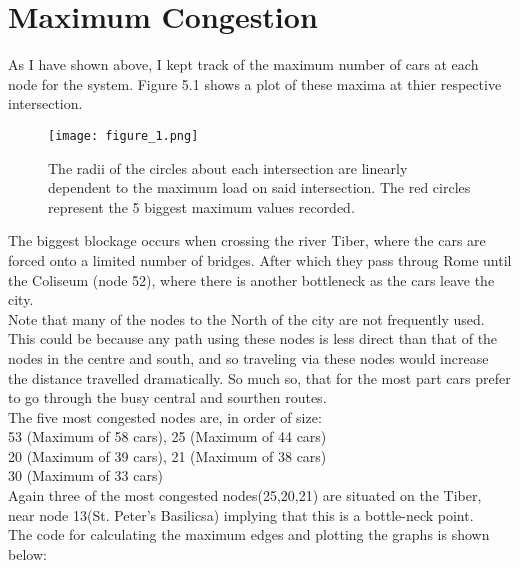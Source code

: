\documentclass[paper=a4, fontsize=12pt]{scrartcl} %
\numberwithin{equation}{section}       %
\numberwithin{figure}{section}         %
\numberwithin{table}{section}          %
\begin{document}
\section{Maximum Congestion}
As I have shown above, I kept track of the maximum number of cars at each node for the system. Figure 5.1 shows a plot of these maxima at thier respective intersection.  
\begin{figure}[H]
	\centering
	\texttt{[image: figure\_1.png]}
	\caption{The radii of the circles about each intersection are linearly dependent to the maximum load on said intersection. The red circles represent the 5 biggest maximum values recorded.}
\end{figure}
The biggest blockage occurs when crossing the river Tiber, where the cars are forced onto a limited number of bridges. After which they pass throug Rome until the Coliseum (node 52), where there is another bottleneck as the cars leave the city. \\Note that many of the nodes to the North of the city are not frequently used. This could be because any path using these nodes is less direct than that of the nodes in the centre and south, and so traveling via these nodes would increase the distance travelled dramatically. So much so, that for the most part cars prefer to go through the busy central and sourthen routes.\\
The five most congested nodes are, in order of size:
 \\53 (Maximum of 58 cars), 25 (Maximum of 44 cars)
 \\20 (Maximum of 39 cars), 21 (Maximum of 38 cars)
 \\30 (Maximum of 33 cars)
\\Again three of the most congested nodes(25,20,21) are situated on the Tiber, near node 13(St. Peter's Basilicsa) implying that this is a bottle-neck point.
\\The code for calculating the maximum edges and plotting the graphs is shown below:
\end{document}
